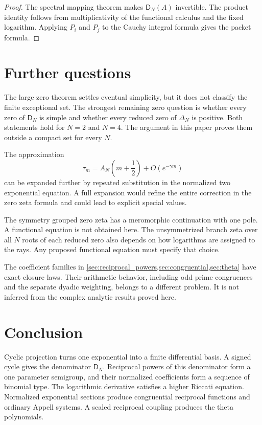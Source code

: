 \documentclass{aomart}
\theoremstyle{definition}
\theoremstyle{remark}
\newcommand{\Dfun}{\mathsf D}
\begin{document}
\begin{proof}
The spectral mapping theorem makes $\Dfun_N(A)$ invertible.  The product identity follows from multiplicativity of the functional calculus and the fixed logarithm.  Applying $P_i$ and $P_j$ to the Cauchy integral formula gives the packet formula.
\end{proof}

\section{Further questions}\label{sec:further_questions}

The large zero theorem settles eventual simplicity, but it does not classify the finite exceptional set.  The strongest remaining zero question is whether every zero of $\Dfun_N$ is simple and whether every reduced zero of $\Delta_N$ is positive.  Both statements hold for $N=2$ and $N=4$.  The argument in this paper proves them outside a compact set for every $N$.

The approximation
\[
\tau_m
=
A_N\left(m+\frac12\right)
+O(e^{-\gamma m})
\]
can be expanded further by repeated substitution in the normalized two exponential equation.  A full expansion would refine the entire correction in the zero zeta formula and could lead to explicit special values.

The symmetry grouped zero zeta has a meromorphic continuation with one pole.  A functional equation is not obtained here.  The unsymmetrized branch zeta over all $N$ roots of each reduced zero also depends on how logarithms are assigned to the rays.  Any proposed functional equation must specify that choice.

The coefficient families in \cref{sec:reciprocal_powers,sec:congruential,sec:theta} have exact closure laws.  Their arithmetic behavior, including odd prime congruences and the separate dyadic weighting, belongs to a different problem.  It is not inferred from the complex analytic results proved here.

\section{Conclusion}\label{sec:conclusion}

Cyclic projection turns one exponential into a finite differential basis.  A signed cycle gives the denominator $\Dfun_N$.  Reciprocal powers of this denominator form a one parameter semigroup, and their normalized coefficients form a sequence of binomial type.  The logarithmic derivative satisfies a higher Riccati equation.  Normalized exponential sections produce congruential reciprocal functions and ordinary Appell systems.  A scaled reciprocal coupling produces the theta polynomials.
\end{document}

